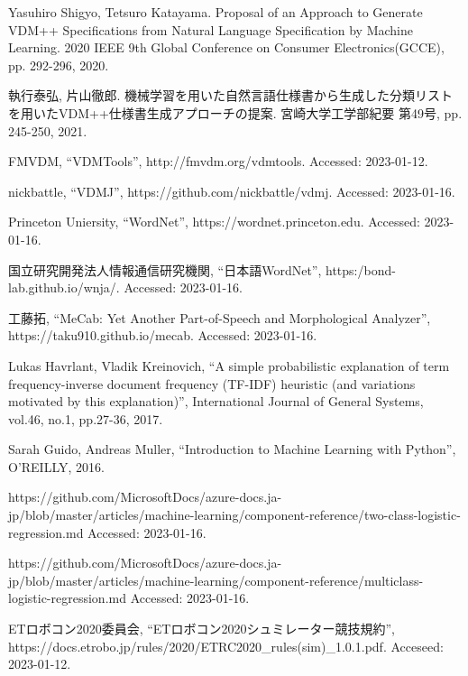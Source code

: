 \documentclass[uplatex, report, a4j, 10pt]{jsbook}
\begin{document}
\begin{thebibliography}{10}
     Yasuhiro Shigyo, Tetsuro Katayama. 
    Proposal of an Approach to Generate VDM++ Specifications from Natural Language Specification by Machine Learning. 
    2020 IEEE 9th Global Conference on Consumer Electronics(GCCE), 
    pp. 292-296, 2020.

    執行泰弘, 片山徹郎. 
    機械学習を用いた自然言語仕様書から生成した分類リストを用いたVDM++仕様書生成アプローチの提案. 
    宮崎大学工学部紀要 第49号, 
    pp. 245-250, 2021.

    FMVDM, “VDMTools”, http:\slash \slash fmvdm.org\slash vdmtools. Accessed: 2023-01-12.

    nickbattle, “VDMJ”, https:\slash \slash github.com\slash nickbattle\slash vdmj. Accessed: 2023-01-16.

    Princeton Uniersity, ``WordNet'', https:\slash \slash wordnet.princeton.edu. Accessed: 2023-01-16.

    国立研究開発法人情報通信研究機関, ``日本語WordNet'', https:\slash bond-lab.github.io\slash wnja\slash. Accessed: 2023-01-16.

    工藤拓, “MeCab: Yet Another Part-of-Speech and Morphological Analyzer”,  https:\slash \slash taku910.github.io\slash mecab. Accessed: 2023-01-16.

    Lukas Havrlant, Vladik Kreinovich,  “A simple probabilistic explanation of term frequency-inverse document frequency (TF-IDF) heuristic (and variations motivated by this explanation)”, International Journal of General Systems, vol.46, no.1, pp.27-36, 2017.

    Sarah Guido, Andreas Muller, “Introduction to Machine Learning with Python”, O'REILLY, 2016.

    https:\slash \slash github.com\slash MicrosoftDocs\slash azure-docs.ja-jp\slash blob\slash master\slash articles\slash machine-learning\slash component-reference\slash two-class-logistic-regression.md Accessed: 2023-01-16.

    https:\slash \slash github.com\slash MicrosoftDocs\slash azure-docs.ja-jp\slash blob\slash master\slash articles\slash machine-learning\slash component-reference\slash multiclass-logistic-regression.md Accessed: 2023-01-16.

    ETロボコン2020委員会,  “ETロボコン2020シュミレーター競技規約”, https:\slash \slash docs.etrobo.jp\slash rules\slash 2020\slash ETRC2020\_rules(sim)\_1.0.1.pdf. Acceseed: 2023-01-12.


\end{thebibliography}
\end{document}
